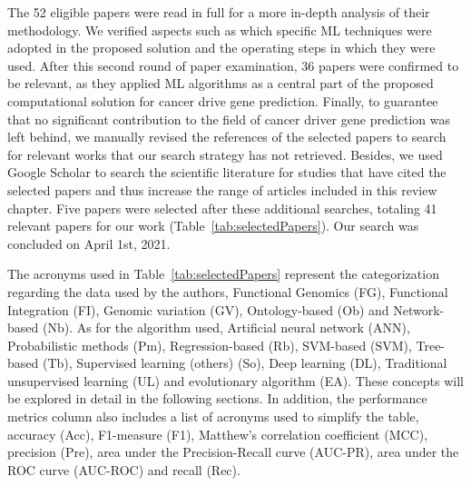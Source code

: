 The 52 eligible papers were read in full for a more in-depth analysis of their methodology. We verified aspects such as which specific ML techniques were adopted in the proposed solution and the operating steps in which they were used. After this second round of paper examination, 36 papers were confirmed to be relevant, as they applied ML algorithms as a central part of the proposed computational solution for cancer drive gene prediction. Finally, to guarantee that no significant contribution to the field of cancer driver gene prediction was left behind, we manually revised the references of the selected papers to search for relevant works that our search strategy has not retrieved. Besides, we used Google Scholar to search the scientific literature for studies that have cited the selected papers and thus increase the range of articles included in this review chapter. Five papers were selected after these additional searches, totaling 41 relevant papers for our work (Table~\ref{tab:selectedPapers}). Our search was concluded on April 1st, 2021.

The acronyms used in Table~\ref{tab:selectedPapers} represent the categorization regarding the data used by the authors, Functional Genomics (FG), Functional Integration (FI), Genomic variation (GV), Ontology-based (Ob) and Network-based (Nb). As for the algorithm used, Artificial neural network (ANN), Probabilistic methods (Pm), Regression-based (Rb), SVM-based (SVM), Tree-based (Tb), Supervised learning (others) (So), Deep learning (DL), Traditional unsupervised learning (UL) and evolutionary algorithm (EA). These concepts will be explored in detail in the following sections. In addition, the performance metrics column also includes a list of acronyms used to simplify the table, accuracy (Acc), F1-measure (F1), Matthew's correlation coefficient (MCC), precision (Pre), area under the Precision-Recall curve (AUC-PR), area under the ROC curve (AUC-ROC) and recall (Rec).






